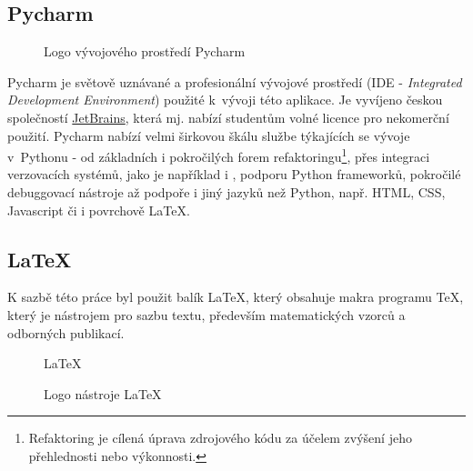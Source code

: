 \begin{sloppypar}
\end{sloppypar}

\subsection{Pycharm}

\begin{figure}[bht]
	\centering
	
	\caption{Logo vývojového prostředí Pycharm}
\end{figure}

\begin{sloppypar}
	Pycharm je světově uznávané a profesionální vývojové prostředí (IDE - \emph{Integrated Development Environment}) použité k~vývoji této aplikace. Je vyvíjeno českou společností \href{https://www.jetbrains.com/}{JetBrains}, která mj. nabízí studentům volné licence pro nekomerční použití. Pycharm nabízí velmi širkovou škálu službe týkajících se vývoje v~Pythonu - od základních i pokročilých forem refaktoringu\footnote{Refaktoring je cílená úprava zdrojového kódu za účelem zvýšení jeho přehlednosti nebo výkonnosti.}, přes integraci verzovacích systémů, jako je například i , podporu Python frameworků, pokročilé debuggovací nástroje až podpoře i jiný jazyků než Python, např. HTML, CSS, Javascript či i povrchově \LaTeX{}.
\end{sloppypar}

\subsection{\LaTeX}

K sazbě této práce byl použit balík \LaTeX, který obsahuje makra programu \TeX, který je nástrojem pro sazbu textu, především matematických vzorců a odborných publikací.
\begin{figure}[bht]
	\centering
	\Huge
	\LaTeX
	\caption{Logo nástroje \LaTeX}
\end{figure}